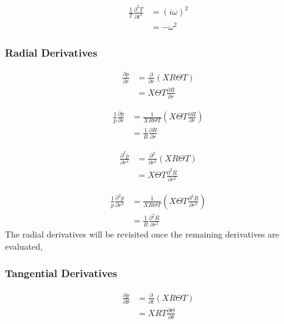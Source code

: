 \documentclass[a4paper]{article}
\begin{document}
\begin{align*}
    \frac{1}{T}\frac{\partial^2 T}{\partial t^2} 
    &=
    (i\omega)^2 \\
    &= -\omega^2
\end{align*}


\subsubsection{Radial Derivatives}
\begin{align*}
    \frac{\partial p}{\partial r} 
    &=
    \frac{\partial }{\partial r}  \left( XR\Theta T \right) \\
    &=
    X\Theta T\frac{\partial R}{\partial r}  
\end{align*}


\begin{align*}
    \frac{1}{p}\frac{\partial p}{\partial r} 
    &=
    \frac{ 1}{X R \Theta T}  \left( X\Theta T\frac{\partial R}{\partial r} \right) \\
    &=\frac{ 1}{ R}\frac{\partial R}{\partial r}  
\end{align*}

\begin{align*}
    \frac{\partial^2 p}{\partial r^2} 
    &=
    \frac{\partial^2 }{\partial r^2}  \left( XR\Theta T \right) \\
    &=
    X\Theta T\frac{\partial^2 R}{\partial r^2}  
\end{align*}


\begin{align*}
    \frac{1}{p}\frac{\partial^2 p}{\partial r^2} 
    &=
    \frac{ 1}{X R \Theta T}  \left( X\Theta T \frac{\partial^2 R}{\partial r^2} \right) \\
    &=\frac{ 1}{ R}\frac{\partial^2 R}{\partial r^2}  
\end{align*}
The radial derivatives will be revisited once the remaining derivatives are evaluated,

\subsubsection{Tangential Derivatives}

\begin{align*}
    \frac{\partial p}{\partial \theta } 
    &=
    \frac{\partial }{\partial t}  \left( XR\Theta T \right) \\
    &=
    XRT\frac{\partial \Theta}{\partial \theta}  
\end{align*}
\end{document}
